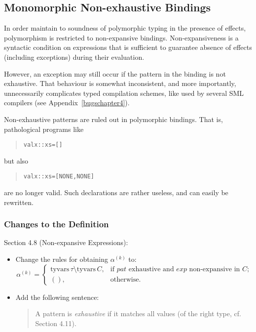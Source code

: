 \documentclass[twoside,titlepage]{article}
\begin{document}
\begin{appendix}
\subsection{Monomorphic Non-exhaustive Bindings}
\label{ext-monomorphism}

In order maintain to soundness of polymorphic typing in the presence of effects, polymorphism is restricted to non-expansive bindings. Non-expansiveness is a syntactic condition on expressions that is sufficient to guarantee absence of effects (including exceptions) during their evaluation.

However, an exception may still occur if the pattern in the binding is not exhaustive. That behaviour is somewhat inconsistent, and more importantly, unnecessarily complicates typed compilation schemes, like used by several SML compilers (see Appendix~\ref{bugschapter4}).

Non-exhaustive patterns are ruled out in polymorphic bindings. That is, pathological programs like
\begin{quote}
\begin{alltt}
val x::xs = []
\end{alltt}
\end{quote}
but also
\begin{quote}
\begin{alltt}
val x::xs = [NONE, NONE]
\end{alltt}
\end{quote}
are no longer valid. Such declarations are rather useless, and can easily be rewritten.

\subsubsection*{Changes to the Definition}

Section 4.8 (Non-expansive Expressions):
\begin{itemize}
\item Change the rules for obtaining $\alpha^{(k)}$ to:
  $$
  \alpha^{(k)} = \left\{
    \begin{array}{ll}
    \mbox{tyvars}\, \tau \setminus \mbox{tyvars}\, C,  & \textrm{if $\mathit{pat}$ exhaustive and $\mathit{exp}$ non-expansive in $C$;} \\
    (), & \textrm{otherwise.}
    \end{array} \right.
  $$

\item Add the following sentence:
  \begin{quote}
  A pattern is \emph{exhaustive} if it matches all values (of the right type, cf. Section 4.11).
  \end{quote}
\end{itemize}


\end{appendix}
\end{document}
